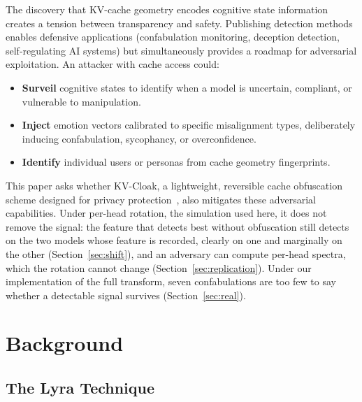 \documentclass[11pt,a4paper]{article}
\begin{document}
The discovery that KV-cache geometry encodes cognitive state information
creates a tension between transparency and safety. Publishing detection
methods enables defensive applications (confabulation monitoring,
deception detection, self-regulating AI systems) but simultaneously
provides a roadmap for adversarial exploitation. An attacker with cache
access could:

\begin{itemize}
\item \textbf{Surveil} cognitive states to identify when a model is
uncertain, compliant, or vulnerable to manipulation.
\item \textbf{Inject} emotion vectors calibrated to specific
misalignment types, deliberately inducing confabulation, sycophancy, or
overconfidence.
\item \textbf{Identify} individual users or personas from cache geometry
fingerprints.
\end{itemize}

This paper asks whether KV-Cloak, a lightweight, reversible
cache obfuscation scheme designed for privacy
protection~\citep{luo2025shadow}, also mitigates these adversarial
capabilities. Under per-head rotation, the simulation used here, it does
not remove the signal: the feature that detects best without obfuscation
still detects on the two models whose feature is recorded, clearly on one
and marginally on the other (Section~\ref{sec:shift}), and an adversary
can compute per-head spectra, which the rotation cannot change
(Section~\ref{sec:replication}). Under our implementation of the full
transform, seven confabulations are too few to say whether a detectable
signal survives (Section~\ref{sec:real}).

\section{Background}

\subsection{The Lyra Technique}
\end{document}
